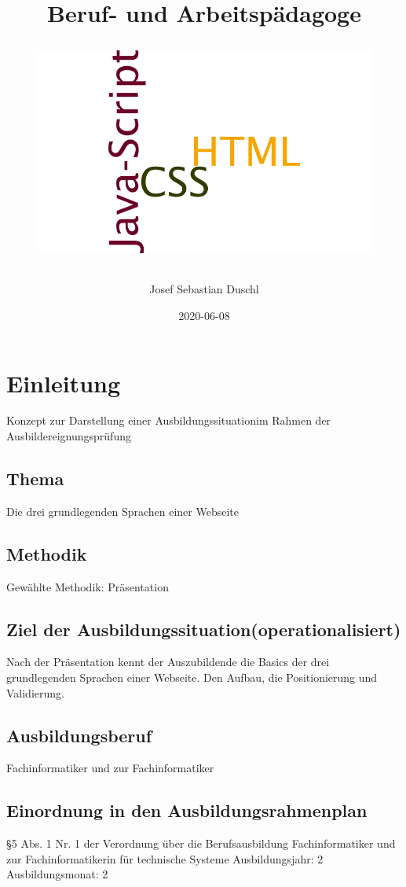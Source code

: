 \documentclass{article}
\title{
	Beruf- und Arbeitspädagoge\\
	 \thema
	\newline
	\begin{figure}[h!]
		\vspace{15mm}
	\includegraphics[scale=0.2, width=\linewidth]{../pics/htmlCssJsWordwordle.png}
\end{figure}
	\vfill
}
\author{
	Josef Sebastian Duschl
}
\date{2020-06-08}
\newcommand{\thema}{Die drei grundlegenden Sprachen einer Webseite}
\begin{document}


    \maketitle
    \newpage

    \tableofcontents %
    \newpage

	\section{Einleitung}
	Konzept zur Darstellung einer Ausbildungssituationim Rahmen der Ausbildereignungsprüfung
	\subsection{Thema}
	\thema

    \subsection{Methodik}
        Gewählte Methodik: Präsentation
     
    \subsection{Ziel der Ausbildungssituation(operationalisiert)}     
        Nach der Präsentation kennt der Auszubildende die Basics der drei grundlegenden Sprachen einer Webseite. Den Aufbau, die Positionierung und Validierung.
        
    \subsection{Ausbildungsberuf}
    Fachinformatiker und zur Fachinformatiker
    
    \subsection{Einordnung in den Ausbildungsrahmenplan}
    §5 Abs. 1 Nr. 1 der Verordnung über die Berufsausbildung  Fachinformatiker und zur Fachinformatikerin für technische Systeme
    \newline
    Ausbildungsjahr: 2\\
    Ausbildungsmonat: 2\\
   
\end{document}
